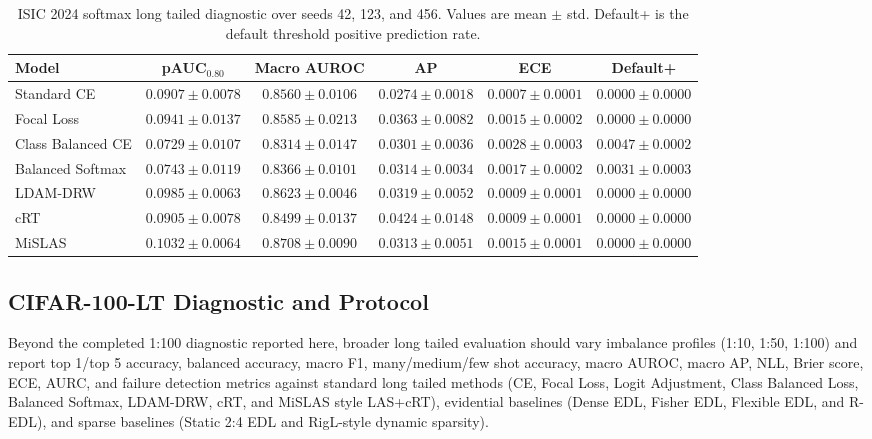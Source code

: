 \documentclass[letterpaper]{article}
\begin{document}
\begin{table}[tbp]
\centering
\scriptsize
\caption{ISIC 2024 softmax long tailed diagnostic over seeds 42, 123, and 456. Values are mean $\pm$ std. Default+ is the default threshold positive prediction rate.}
\label{tab:isic_softmax_lt_diagnostic}
\setlength{\tabcolsep}{1.5pt}
\begin{adjustbox}{max width=\columnwidth}
\begin{tabular}{@{}l C C C C C@{}}
\toprule
Model & pAUC$_{0.80}$ & Macro AUROC & AP & ECE & Default+ \\
\midrule
Standard CE & $0.0907\pm0.0078$ & $0.8560\pm0.0106$ & $0.0274\pm0.0018$ & $0.0007\pm0.0001$ & $0.0000\pm0.0000$ \\
Focal Loss & $0.0941\pm0.0137$ & $0.8585\pm0.0213$ & $0.0363\pm0.0082$ & $0.0015\pm0.0002$ & $0.0000\pm0.0000$ \\
Class Balanced CE & $0.0729\pm0.0107$ & $0.8314\pm0.0147$ & $0.0301\pm0.0036$ & $0.0028\pm0.0003$ & $0.0047\pm0.0002$ \\
Balanced Softmax & $0.0743\pm0.0119$ & $0.8366\pm0.0101$ & $0.0314\pm0.0034$ & $0.0017\pm0.0002$ & $0.0031\pm0.0003$ \\
LDAM-DRW & $0.0985\pm0.0063$ & $0.8623\pm0.0046$ & $0.0319\pm0.0052$ & $0.0009\pm0.0001$ & $0.0000\pm0.0000$ \\
cRT & $0.0905\pm0.0078$ & $0.8499\pm0.0137$ & $\mathbf{0.0424\pm0.0148}$ & $0.0009\pm0.0001$ & $0.0000\pm0.0000$ \\
MiSLAS & $\mathbf{0.1032\pm0.0064}$ & $\mathbf{0.8708\pm0.0090}$ & $0.0313\pm0.0051$ & $0.0015\pm0.0001$ & $0.0000\pm0.0000$ \\
\bottomrule
\end{tabular}
\end{adjustbox}
\end{table}

\subsection{CIFAR-100-LT Diagnostic and Protocol}
Beyond the completed 1:100 diagnostic reported here, broader long tailed
evaluation should vary imbalance profiles (1:10, 1:50, 1:100) and report
top 1/top 5 accuracy, balanced accuracy, macro F1, many/medium/few shot accuracy,
macro AUROC, macro AP, NLL, Brier score, ECE, AURC, and failure detection
metrics against standard long tailed methods (CE, Focal Loss, Logit Adjustment,
Class Balanced Loss, Balanced Softmax, LDAM-DRW, cRT, and MiSLAS style LAS+cRT),
evidential baselines (Dense EDL, Fisher EDL, Flexible EDL, and R-EDL), and
sparse baselines (Static 2:4 EDL and RigL-style dynamic sparsity).
\end{document}
